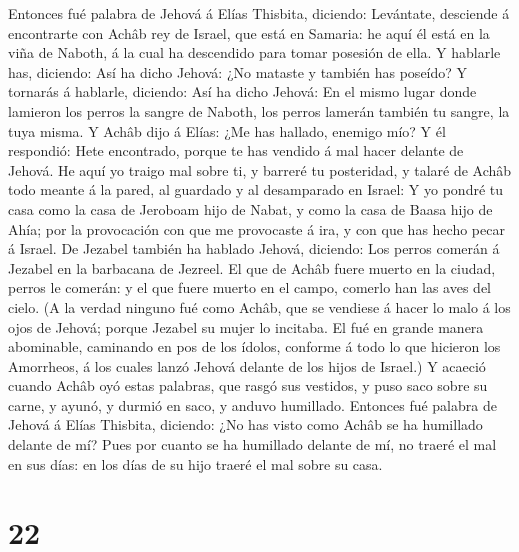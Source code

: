 Entonces fué palabra de Jehová á Elías Thisbita, diciendo:
 Levántate, desciende á encontrarte con Achâb rey de
Israel, que está en Samaria: he aquí él está en la viña de Naboth, á la
cual ha descendido para tomar posesión de ella.  Y
hablarle has, diciendo: Así ha dicho Jehová: ¿No mataste y también has
poseído? Y tornarás á hablarle, diciendo: Así ha dicho Jehová: En el
mismo lugar donde lamieron los perros la sangre de Naboth, los perros
lamerán también tu sangre, la tuya misma.  Y Achâb dijo á
Elías: ¿Me has hallado, enemigo mío? Y él respondió: Hete encontrado,
porque te has vendido á mal hacer delante de Jehová.  He
aquí yo traigo mal sobre ti, y barreré tu posteridad, y talaré de Achâb
todo meante á la pared, al guardado y al desamparado en Israel:
 Y yo pondré tu casa como la casa de Jeroboam hijo de
Nabat, y como la casa de Baasa hijo de Ahía; por la provocación con que
me provocaste á ira, y con que has hecho pecar á Israel. 
De Jezabel también ha hablado Jehová, diciendo: Los perros comerán á
Jezabel en la barbacana de Jezreel.  El que de Achâb
fuere muerto en la ciudad, perros le comerán: y el que fuere muerto en
el campo, comerlo han las aves del cielo.  (A la verdad
ninguno fué como Achâb, que se vendiese á hacer lo malo á los ojos de
Jehová; porque Jezabel su mujer lo incitaba.  El fué en
grande manera abominable, caminando en pos de los ídolos, conforme á
todo lo que hicieron los Amorrheos, á los cuales lanzó Jehová delante de
los hijos de Israel.)  Y acaeció cuando Achâb oyó estas
palabras, que rasgó sus vestidos, y puso saco sobre su carne, y ayunó, y
durmió en saco, y anduvo humillado.  Entonces fué palabra
de Jehová á Elías Thisbita, diciendo:  ¿No has visto como
Achâb se ha humillado delante de mí? Pues por cuanto se ha humillado
delante de mí, no traeré el mal en sus días: en los días de su hijo
traeré el mal sobre su casa.

\hypertarget{section-21}{%
\section{22}\label{section-21}}

